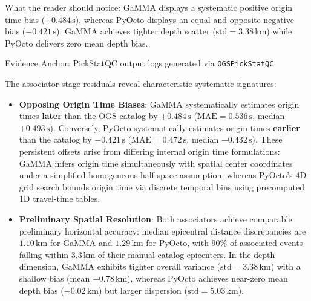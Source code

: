 \begin{table}[htbp]
\begin{threeparttable}
\begin{tablenotes}[flushleft]
      \item What the reader should notice: GaMMA displays a systematic positive origin time bias ($+0.484\,\unit{\second}$), whereas PyOcto displays an equal and opposite negative bias ($-0.421\,\unit{\second}$). GaMMA achieves tighter depth scatter ($\mathrm{std} = 3.38\,\unit{\kilo\meter}$) while PyOcto delivers zero mean depth bias.
      \item Evidence Anchor: PickStatQC output logs generated via \texttt{OGSPickStatQC}.
    \end{tablenotes}
  \end{threeparttable}
\end{table}

The associator-stage residuals reveal characteristic systematic signatures:
\begin{itemize}
  \item \textbf{Opposing Origin Time Biases}: GaMMA systematically estimates origin times \textbf{later} than the OGS catalog by $+0.484\,\unit{\second}$ ($\mathrm{MAE} = 0.536\,\unit{\second}$, median $+0.493\,\unit{\second}$). Conversely, PyOcto systematically estimates origin times \textbf{earlier} than the catalog by $-0.421\,\unit{\second}$ ($\mathrm{MAE} = 0.472\,\unit{\second}$, median $-0.432\,\unit{\second}$). These persistent offsets arise from differing internal origin time formulations: GaMMA infers origin time simultaneously with spatial center coordinates under a simplified homogeneous half-space assumption, whereas PyOcto's 4D grid search bounds origin time via discrete temporal bins using precomputed 1D travel-time tables.
  \item \textbf{Preliminary Spatial Resolution}: Both associators achieve comparable preliminary horizontal accuracy: median epicentral distance discrepancies are $1.10\,\unit{\kilo\meter}$ for GaMMA and $1.29\,\unit{\kilo\meter}$ for PyOcto, with $90\%$ of associated events falling within $3.3\,\unit{\kilo\meter}$ of their manual catalog epicenters. In the depth dimension, GaMMA exhibits tighter overall variance ($\mathrm{std} = 3.38\,\unit{\kilo\meter}$) with a shallow bias (mean $-0.78\,\unit{\kilo\meter}$), whereas PyOcto achieves near-zero mean depth bias ($-0.02\,\unit{\kilo\meter}$) but larger dispersion ($\mathrm{std} = 5.03\,\unit{\kilo\meter}$).
\end{itemize}


